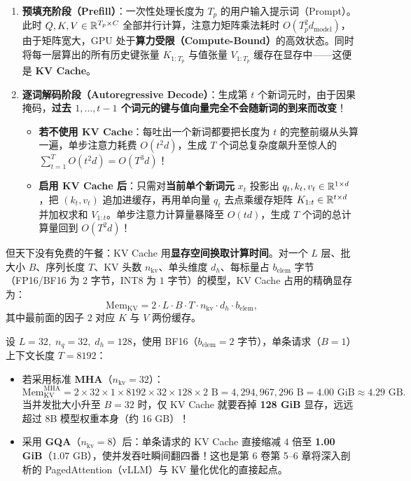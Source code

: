 \begin{enumerate}
  \item \textbf{预填充阶段（Prefill）}：一次性处理长度为 $T_p$ 的用户输入提示词（Prompt）。此时 $Q, K, V \in \mathbb{R}^{T_p \times C}$ 全部并行计算，注意力矩阵乘法耗时 $O(T_p^2 d_{\text{model}})$，由于矩阵宽大，GPU 处于\textbf{算力受限（Compute-Bound）}的高效状态。同时将每一层算出的所有历史键张量 $K_{1:T_p}$ 与值张量 $V_{1:T_p}$ 缓存在显存中——这便是 \textbf{KV Cache}。
  \item \textbf{逐词解码阶段（Autoregressive Decode）}：生成第 $t$ 个新词元时，由于因果掩码，\textbf{过去 $1, \dots, t-1$ 个词元的键与值向量完全不会随新词的到来而改变}！
  \begin{itemize}
    \item \textbf{若不使用 KV Cache}：每吐出一个新词都要把长度为 $t$ 的完整前缀从头算一遍，单步注意力耗费 $O(t^2 d)$，生成 $T$ 个词总复杂度飙升至惊人的 $\sum_{t=1}^T O(t^2 d) = O(T^3 d)$！
    \item \textbf{启用 KV Cache 后}：只需对\textbf{当前单个新词元} $x_t$ 投影出 $q_t, k_t, v_t \in \mathbb{R}^{1 \times d}$，把 $(k_t, v_t)$ 追加进缓存，再用单向量 $q_t$ 去点乘缓存矩阵 $K_{1:t} \in \mathbb{R}^{t \times d}$ 并加权求和 $V_{1:t}$。单步注意力计算量暴降至 $O(t d)$，生成 $T$ 个词的总计算量回到 $O(T^2 d)$！
  \end{itemize}
\end{enumerate}

但天下没有免费的午餐：KV Cache 用\textbf{显存空间换取计算时间}。对一个 $L$ 层、批大小 $B$、序列长度 $T$、KV 头数 $n_{\text{kv}}$、单头维度 $d_h$、每标量占 $b_{\text{elem}}$ 字节（FP16/BF16 为 $2$ 字节，INT8 为 $1$ 字节）的模型，KV Cache 占用的精确显存为：
\begin{equation}
  \text{Mem}_{\mathrm{KV}} = 2 \cdot L \cdot B \cdot T \cdot n_{\text{kv}} \cdot d_h \cdot b_{\text{elem}},
  \label{eq:kv-cache-mem}
\end{equation}
其中最前面的因子 $2$ 对应 $K$ 与 $V$ 两份缓存。

\begin{example}
设 $L = 32,\; n_q = 32,\; d_h = 128$，使用 BF16（$b_{\text{elem}} = 2$ 字节），单条请求（$B = 1$）上下文长度 $T = 8192$：
\begin{itemize}
  \item 若采用标准 \textbf{MHA}（$n_{\text{kv}} = 32$）：
  \[
    \text{Mem}_{\mathrm{KV}}^{\mathrm{MHA}} = 2 \times 32 \times 1 \times 8192 \times 32 \times 128 \times 2 \text{ B} = 4{,}294{,}967{,}296 \text{ B} = 4.00\text{ GiB} \approx 4.29\text{ GB}.
  \]
  当并发批大小升至 $B = 32$ 时，仅 KV Cache 就要吞掉 \textbf{128 GiB} 显存，远远超过 8B 模型权重本身（约 16 GB）！
  \item 采用 \textbf{GQA}（$n_{\text{kv}} = 8$）后：单条请求的 KV Cache 直接缩减 $4$ 倍至 \textbf{1.00 GiB}（$1.07\text{ GB}$），使并发吞吐瞬间翻四番！这也是第 6 卷第 5--6 章将深入剖析的 PagedAttention（vLLM）与 KV 量化优化的直接起点。
\end{itemize}
\end{example}


